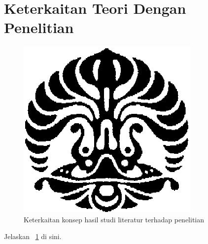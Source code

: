 \section{Keterkaitan Teori Dengan Penelitian}
\begin{figure}
	\centering
	\includegraphics[width=0.8\textwidth]{assets/pics/makara.png}
	\caption{Keterkaitan konsep hasil studi literatur terhadap penelitian}
	\label{fig:research_concept_map}
\end{figure}

Jelaskan \pic~\ref{fig:research_concept_map} di sini.

